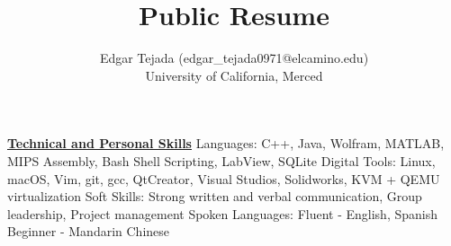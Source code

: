 \documentclass [12pt]{article}
\title{Public Resume}
\author{Edgar Tejada (edgar_tejada0971@elcamino.edu)\\University of California, Merced}
\begin{document}
\begin{flushleft}
\underline{\textbf{Technical and Personal Skills}}
\linebreak
Languages:‭ 	‬C++,‭ ‬Java,‭ ‬Wolfram,‭ ‬MATLAB,‭ MIPS Assembly,‭ ‬Bash Shell Scripting,‭ ‬LabView,‭ ‬SQLite
Digital Tools:‭	‬Linux,‭ ‬macOS,‭ ‬Vim,‭ ‬git,‭ ‬gcc,‭ ‬QtCreator,‭ ‬Visual Studios, Solidworks, KVM + QEMU virtualization
Soft Skills:‭	‬Strong written and verbal communication,‭ ‬Group leadership, Project management
Spoken Languages:‭	‬Fluent -‭ ‬English,‭ ‬Spanish‭ ‬Beginner - Mandarin Chinese 



\setlength{\parindent}{0.5in}

\end{flushleft}
\end{document}
